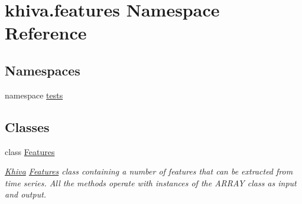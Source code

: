 \hypertarget{namespacekhiva_1_1features}{}\section{khiva.\+features Namespace Reference}
\label{namespacekhiva_1_1features}
\subsection*{Namespaces}
\begin{DoxyCompactItemize}
\item 
namespace \mbox{\hyperlink{namespacekhiva_1_1features_1_1tests}{tests}}
\end{DoxyCompactItemize}
\subsection*{Classes}
\begin{DoxyCompactItemize}
\item 
class \mbox{\hyperlink{classkhiva_1_1features_1_1_features}{Features}}
\begin{DoxyCompactList}\small\item\em \mbox{\hyperlink{classkhiva_1_1_khiva}{Khiva}} \mbox{\hyperlink{classkhiva_1_1features_1_1_features}{Features}} class containing a number of features that can be extracted from time series. All the methods operate with instances of the A\+R\+R\+AY class as input and output. \end{DoxyCompactList}\end{DoxyCompactItemize}
